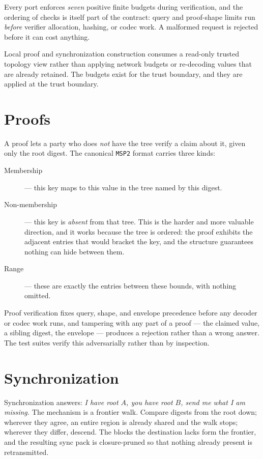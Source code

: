 \documentclass[11pt,twoside,openright]{book}
\newcommand{\code}[1]{\texorpdfstring{\textcolor{d7ink}{\texttt{#1}}}{#1}}
\begin{document}
\begin{contractbox}
Every port enforces \emph{seven} positive finite budgets during verification, and
the ordering of checks is itself part of the contract: query and proof-shape
limits run \emph{before} verifier allocation, hashing, or codec work. A malformed
request is rejected before it can cost anything.

Local proof and synchronization construction consumes a read-only trusted
topology view rather than applying network budgets or re-decoding values that are
already retained. The budgets exist for the trust boundary, and they are applied
at the trust boundary.
\end{contractbox}

\section{Proofs}

A proof lets a party who does \emph{not} have the tree verify a claim about it,
given only the root digest. The canonical \code{MSP2} format carries three kinds:

\begin{description}
\item[Membership] --- this key maps to this value in the tree named by this
digest.
\item[Non-membership] --- this key is \emph{absent} from that tree. This is the
harder and more valuable direction, and it works because the tree is ordered: the
proof exhibits the adjacent entries that would bracket the key, and the structure
guarantees nothing can hide between them.
\item[Range] --- these are exactly the entries between these bounds, with
nothing omitted.
\end{description}

Proof verification fixes query, shape, and envelope precedence before any decoder
or codec work runs, and tampering with any part of a proof --- the claimed value,
a sibling digest, the envelope --- produces a rejection rather than a wrong
answer. The test suites verify this adversarially rather than by inspection.

\section{Synchronization}

Synchronization answers: \emph{I have root $A$, you have root $B$, send me what I
am missing.} The mechanism is a frontier walk. Compare digests from the root
down; wherever they agree, an entire region is already shared and the walk stops;
wherever they differ, descend. The blocks the destination lacks form the
frontier, and the resulting sync pack is closure-pruned so that nothing already
present is retransmitted.
\end{document}
